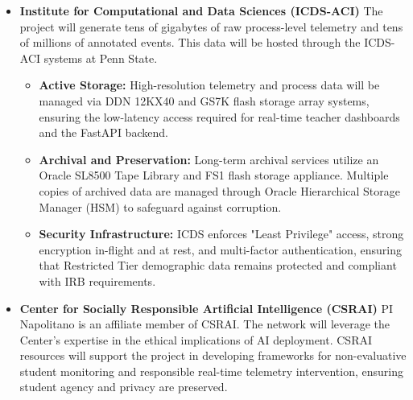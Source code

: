 \documentclass[11pt]{article}
\begin{document}
\begin{itemize}
\item \textbf{Institute for Computational and Data Sciences (ICDS-ACI)}
The project will generate tens of gigabytes of raw process-level telemetry and tens of millions of annotated events. This data will be hosted through the ICDS-ACI systems at Penn State.
\begin{itemize}[noitemsep]
    \item \textbf{Active Storage:} High-resolution telemetry and process data will be managed via DDN 12KX40 and GS7K flash storage array systems, ensuring the low-latency access required for real-time teacher dashboards and the FastAPI backend.
    \item \textbf{Archival and Preservation:} Long-term archival services utilize an Oracle SL8500 Tape Library and FS1 flash storage appliance. Multiple copies of archived data are managed through Oracle Hierarchical Storage Manager (HSM) to safeguard against corruption.
    \item \textbf{Security Infrastructure:} ICDS enforces "Least Privilege" access, strong encryption in-flight and at rest, and multi-factor authentication, ensuring that Restricted Tier demographic data remains protected and compliant with IRB requirements.
\end{itemize}

\item \textbf{Center for Socially Responsible Artificial Intelligence (CSRAI)}
PI Napolitano is an affiliate member of CSRAI. The network will leverage the Center’s expertise in the ethical implications of AI deployment. CSRAI resources will support the project in developing frameworks for non-evaluative student monitoring and responsible real-time telemetry intervention, ensuring student agency and privacy are preserved.


\end{itemize}
\end{document}
